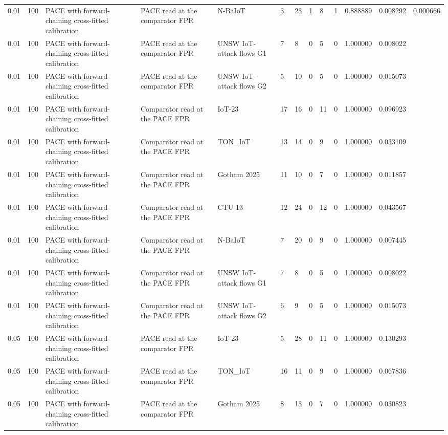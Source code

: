 \begin{tabular}{lllllllllllll}
0.01 & 100 & PACE with forward-chaining cross-fitted calibration & PACE read at the comparator FPR & N-BaIoT & 3 & 23 & 1 & 8 & 1 & 0.888889 & 0.008292 & 0.000666 \\
0.01 & 100 & PACE with forward-chaining cross-fitted calibration & PACE read at the comparator FPR & UNSW IoT-attack flows G1 & 7 & 8 & 0 & 5 & 0 & 1.000000 & 0.008022 &  \\
0.01 & 100 & PACE with forward-chaining cross-fitted calibration & PACE read at the comparator FPR & UNSW IoT-attack flows G2 & 5 & 10 & 0 & 5 & 0 & 1.000000 & 0.015073 &  \\
0.01 & 100 & PACE with forward-chaining cross-fitted calibration & Comparator read at the PACE FPR & IoT-23 & 17 & 16 & 0 & 11 & 0 & 1.000000 & 0.096923 &  \\
0.01 & 100 & PACE with forward-chaining cross-fitted calibration & Comparator read at the PACE FPR & TON\_IoT & 13 & 14 & 0 & 9 & 0 & 1.000000 & 0.033109 &  \\
0.01 & 100 & PACE with forward-chaining cross-fitted calibration & Comparator read at the PACE FPR & Gotham 2025 & 11 & 10 & 0 & 7 & 0 & 1.000000 & 0.011857 &  \\
0.01 & 100 & PACE with forward-chaining cross-fitted calibration & Comparator read at the PACE FPR & CTU-13 & 12 & 24 & 0 & 12 & 0 & 1.000000 & 0.043567 &  \\
0.01 & 100 & PACE with forward-chaining cross-fitted calibration & Comparator read at the PACE FPR & N-BaIoT & 7 & 20 & 0 & 9 & 0 & 1.000000 & 0.007445 &  \\
0.01 & 100 & PACE with forward-chaining cross-fitted calibration & Comparator read at the PACE FPR & UNSW IoT-attack flows G1 & 7 & 8 & 0 & 5 & 0 & 1.000000 & 0.008022 &  \\
0.01 & 100 & PACE with forward-chaining cross-fitted calibration & Comparator read at the PACE FPR & UNSW IoT-attack flows G2 & 6 & 9 & 0 & 5 & 0 & 1.000000 & 0.015073 &  \\
0.05 & 100 & PACE with forward-chaining cross-fitted calibration & PACE read at the comparator FPR & IoT-23 & 5 & 28 & 0 & 11 & 0 & 1.000000 & 0.130293 &  \\
0.05 & 100 & PACE with forward-chaining cross-fitted calibration & PACE read at the comparator FPR & TON\_IoT & 16 & 11 & 0 & 9 & 0 & 1.000000 & 0.067836 &  \\
0.05 & 100 & PACE with forward-chaining cross-fitted calibration & PACE read at the comparator FPR & Gotham 2025 & 8 & 13 & 0 & 7 & 0 & 1.000000 & 0.030823 &  \\

\end{tabular}
